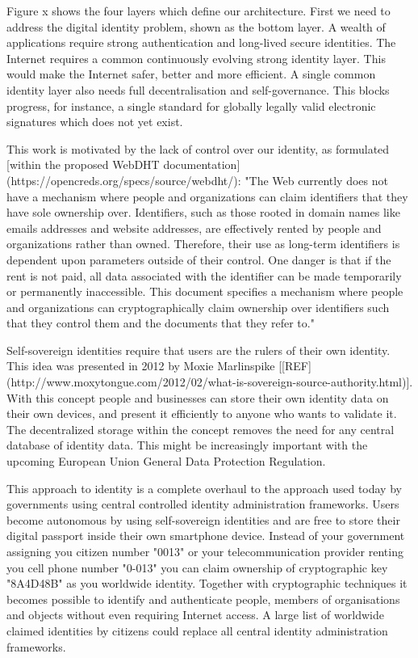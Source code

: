 \documentclass[USenglish]{article}
\begin{document}
Figure x shows the four layers which define our architecture.
First we need to address the digital identity problem, shown as the bottom layer.
A wealth of applications require strong authentication and long-lived secure identities.
The Internet requires a common continuously evolving strong identity layer.
This would make the Internet safer, better and more efficient.
A single common identity layer also needs full decentralisation and self-governance.
This blocks progress, for instance, a single standard for globally legally valid electronic signatures which does not yet exist.

This work is motivated by the lack of control over our identity, as formulated [within the proposed WebDHT documentation](https://opencreds.org/specs/source/webdht/): "The Web currently does not have a mechanism where people and organizations can claim identifiers that they have sole ownership over. Identifiers, such as those rooted in domain names like emails addresses and website addresses, are effectively rented by people and organizations rather than owned. Therefore, their use as long-term identifiers is dependent upon parameters outside of their control. One danger is that if the rent is not paid, all data associated with the identifier can be made temporarily or permanently inaccessible. This document specifies a mechanism where people and organizations can cryptographically claim ownership over identifiers such that they control them and the documents that they refer to."

Self-sovereign identities require that users are the rulers of their own identity.
This idea was presented in 2012 by Moxie Marlinspike [[REF](http://www.moxytongue.com/2012/02/what-is-sovereign-source-authority.html)].
With this concept people and businesses can store their own identity data on their own devices, and present it efficiently to anyone who wants to validate it.
The decentralized storage within the concept removes the need for any central database of identity data.
This might be increasingly important with the upcoming European Union General Data Protection Regulation.

This approach to identity is a complete overhaul to the approach used today by governments using central controlled identity administration frameworks.
Users become autonomous by using self-sovereign identities and are free to store their digital passport inside their own smartphone device.
Instead of your government assigning you citizen number "0013" or your telecommunication provider renting you cell phone number "0-013" you can claim ownership of cryptographic key "8A4D48B" as you worldwide identity.
Together with cryptographic techniques it becomes possible to identify and authenticate people, members of organisations and objects without even requiring Internet access.
A large list of worldwide claimed identities by citizens could replace all central identity administration frameworks.
\end{document}
